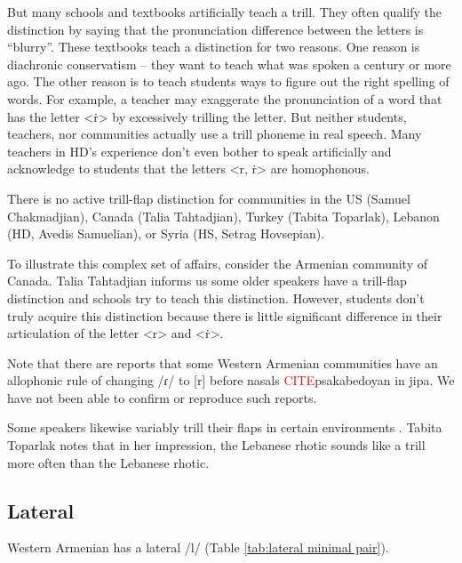     	But many schools and textbooks artificially teach a trill. They often qualify the distinction by saying that the pronunciation difference between the letters is ``blurry''. These textbooks teach a distinction for two reasons. One reason is diachronic conservatism -- they want to teach what was spoken a century or more ago. The other reason is to teach students ways to figure out the right spelling of words. For example, a teacher may exaggerate the pronunciation of a word that has the letter  <\.{r}> by excessively trilling the letter. But neither students, teachers, nor communities actually use a trill phoneme in real speech. Many teachers in HD's experience don't even bother to speak artificially and acknowledge to students that the letters  <r, \.{r}> are homophonous.
    	
    	There is no active trill-flap distinction for communities in the US (Samuel Chakmadjian), Canada (Talia Tahtadjian), Turkey (Tabita Toparlak), Lebanon (HD, Avedis Samuelian), or Syria (HS, Setrag Hovsepian).
    	
    	To illustrate this complex set of affairs, consider the Armenian community of Canada. Talia Tahtadjian informs us some older speakers have a trill-flap distinction and schools try to teach this distinction. However, students don't truly acquire this distinction because there is little significant difference in their articulation of the letter  <r> and  <\.{r}>.
    	
    	
    	
    	
    	
    	
    	
    	
    	
    	
    	Note that there are reports that some Western Armenian communities have an allophonic rule of changing /ɾ/ to [r] before nasals \textcolor{red}{CITE}p{sakabedoyan in jipa}. We have not been able to confirm or reproduce such reports. 
    	
    	Some speakers likewise variably trill their flaps in certain environments \citep{Seyfarth-JIPAArmenian}. Tabita Toparlak notes that in her impression, the Lebanese rhotic sounds like a trill more often than the Lebanese rhotic. 
    	
    	\subsection{Lateral}\label{section:segmentalPhono:cons:lateral}
    	Western Armenian has a lateral /l/ (Table \ref{tab:lateral minimal pair}).
    	
